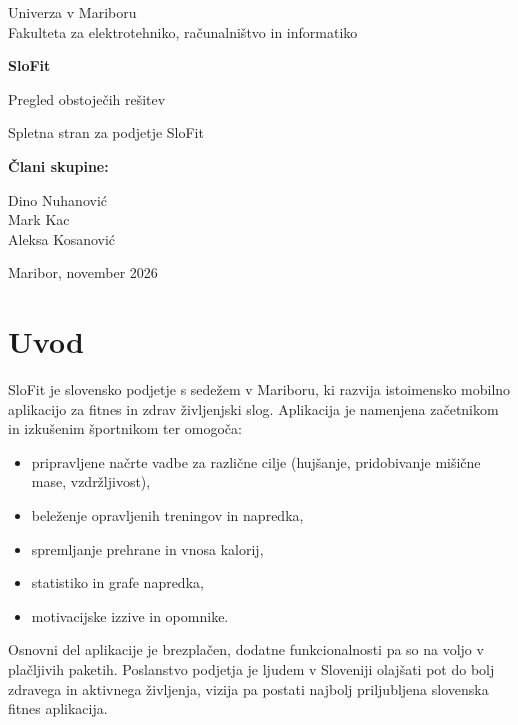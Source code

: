 \documentclass[11pt,a4paper]{article}
\begin{document}
\begin{titlepage}
  \centering
  \vspace*{2cm}
  {\large Univerza v Mariboru\\Fakulteta za elektrotehniko, računalništvo in informatiko\par}
  \vspace{3cm}
  {\Huge\bfseries SloFit\par}
  \vspace{0.6cm}
  {\LARGE Pregled obstoječih rešitev\par}
  \vspace{0.4cm}
  {\large Spletna stran za podjetje SloFit\par}
  \vfill
  {\large\bfseries Člani skupine:\par}
  \vspace{0.3cm}
  {\large
    Dino Nuhanović\\
    Mark Kac\\
    Aleksa Kosanović\par}
  \vspace{2cm}
  {\large Maribor, november 2026\par}
\end{titlepage}

\tableofcontents
\newpage

\section{Uvod}

SloFit je slovensko podjetje s sedežem v Mariboru, ki razvija istoimensko mobilno aplikacijo za fitnes in zdrav življenjski slog. Aplikacija je namenjena začetnikom in izkušenim športnikom ter omogoča:
\begin{itemize}
  \item pripravljene načrte vadbe za različne cilje (hujšanje, pridobivanje mišične mase, vzdržljivost),
  \item beleženje opravljenih treningov in napredka,
  \item spremljanje prehrane in vnosa kalorij,
  \item statistiko in grafe napredka,
  \item motivacijske izzive in opomnike.
\end{itemize}
Osnovni del aplikacije je brezplačen, dodatne funkcionalnosti pa so na voljo v plačljivih paketih. Poslanstvo podjetja je ljudem v Sloveniji olajšati pot do bolj zdravega in aktivnega življenja, vizija pa postati najbolj priljubljena slovenska fitnes aplikacija.
\end{document}
